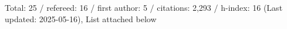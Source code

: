 Total: 25 / refereed: 16 / first author: 5 / citations: 2,293 / h-index: 16 (Last updated: 2025-05-16), List attached below
